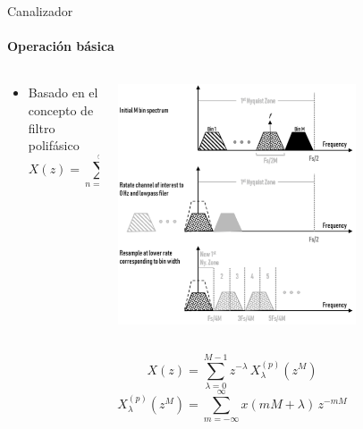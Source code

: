 \documentclass[ignorenonframetext,12pt]{beamer}
\begin{document}
\begin{frame}{Canalizador}
				\framesubtitle{Operación básica}
				\begin{columns}
								\begin{column}{0.5\textwidth}
												\begin{itemize}
																\item Basado en el concepto de filtro polifásico
																				\begin{equation*}\label{eq_transformada_z}
																								X(z) = \sum_{n = -\infty}^{\infty}x(n)\,z^{-n}
																				\end{equation*}


												\end{itemize}
								\end{column}
								\begin{column}{0.5\textwidth}
				\centering
								\includegraphics[width=0.7\textwidth]{pfb_basic1}
								\end{column}
								\end{columns}
																				\begin{equation*}\label{eq_transformada_z_polifasica}
																								X(z) = \sum_{\lambda =
																								0}^{M-1}z^{-\lambda}\,X_\lambda^{(p)}(z^{M})
																				\end{equation*}
																				{\color{blue}\begin{equation*}\label{eq_x_polifasica}
																								X_\lambda^{(p)}(z^{M}) = \sum_{m =-\infty}^{\infty}x(mM+\lambda)\,z^{-mM}
																				\end{equation*}}


\end{frame}
\end{document}
